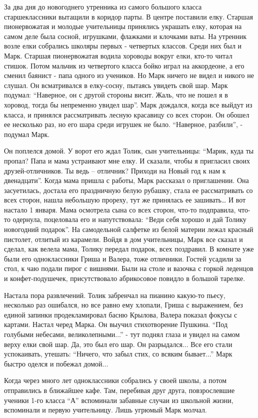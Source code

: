 За два дня до новогоднего утренника из самого большого класса старшеклассники
вытащили в коридор парты. В центре поставили елку. Старшая пионервожатая и
молодые учительницы принялись украшать елку, которая на самом  деле была
сосной, игрушками, флажками и клочками ваты. На утренник возле елки собрались
школяры первых - четвертых классов. Среди них был и Марк. Старшая пионервожатая
водила хороводы вокруг елки, кто-то читал стишок. Потом мальчик из четвертого
класса бойко играл на аккордеоне, а его сменил баянист - папа одного из
учеников. Но Марк ничего не видел и никого не слушал. Он всматривался в
елку-сосну, пытаясь увидеть свой шар. Марк подумал: \enquote{Наверное, он с другой
стороны висит. Жаль, что не пошел я в хоровод, тогда бы непременно увидел шар}.
Марк дождался, когда все выйдут из класса, и принялся рассматривать лесную
красавицу со всех сторон. Он обошел ее несколько раз, но его шара среди игрушек
не было. \enquote{Наверное, разбили}, - подумал Марк.  

Он поплелся домой. У ворот его ждал Толик, сын учительницы: \enquote{Марик, куда ты
пропал? Папа и мама устраивают мне елку. И сказали, чтобы я пригласил своих
друзей-отличников. Ты ведь – отличник? Приходи на Новый год к нам к
двенадцати}. Когда мама пришла с работы, Марк рассказал о приглашении. Она
засуетилась, достала его праздничную белую рубашку, стала ее рассматривать со
всех сторон, нашла небольшую прореху, тут же принялась ее зашивать… И вот
настало 1 января. Мама осмотрела сына со всех сторон, что-то подправила, что-то
одернула, поцеловала его и напутствовала: \enquote{Веди себя хорошо и дай Толику
новогодний подарок}. На самодельной салфетке из белой материи лежал красный
пистолет, отлитый из карамели. Войдя в дом учительницы, Марк все сказал и
сделал, как велела мама, Толику передал подарок, всех поздравил. В комнате уже
были его одноклассники Гриша и Валера, тоже отличники. Гостей усадили за стол,
к чаю подали пирог с вишнями. Были на столе и вазочка с горкой леденцов и
конфет-подушечек, присутствовало абрикосовое повидло в большой тарелке.

Настала пора развлечений. Толик забренчал на пианино какую-то пьесу, несколько
раз ошибался, но все равно ему хлопали, Гриша с выражением, без единой запинки
продекламировал басню Крылова, Валера показал фокусы с картами. Настал черед
Марка. Он выучил стихотворение Пушкина. \enquote{Под голубыми небесами, великолепными...}
- тут поднял глаза и увидел на самом верху елки свой шар. Да, это был его шар.
Он разрыдался... Все его стали успокаивать, утешать: \enquote{Ничего, что забыл стих, со
всяким бывает...} Марк быстро оделся и побежал домой...

Когда через много лет одноклассники собрались у своей школы, а потом
отправились в ближайшее кафе. Там, перебивая друг друга, повзрослевшие ученики
1-го класса \enquote{А} вспоминали забавные случаи из школьной жизни, вспоминали и
первую учительницу. Лишь угрюмый Марк молчал.
